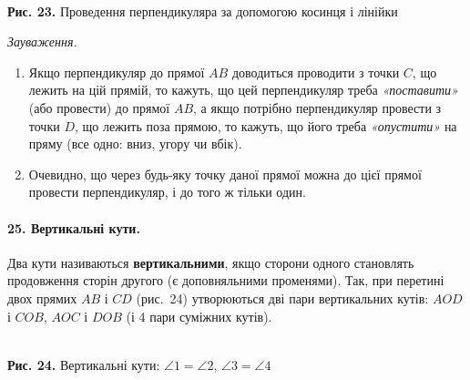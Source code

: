 \begin{center}
\\[4pt]
{\small\textbf{Рис. 23.} Проведення перпендикуляра за допомогою косинця і лінійки}
\end{center}

\textit{Зауваження.}
\begin{enumerate}
    \item Якщо перпендикуляр до прямої $AB$ доводиться проводити з точки $C$, що лежить на цій прямій, то кажуть, що цей перпендикуляр треба \textit{«поставити»} (або провести) до прямої $AB$, а якщо потрібно перпендикуляр провести з точки $D$, що лежить поза прямою, то кажуть, що його треба \textit{«опустити»} на пряму (все одно: вниз, угору чи вбік).
    \item Очевидно, що через будь-яку точку даної прямої можна до цієї прямої провести перпендикуляр, і до того ж тільки один.
\end{enumerate}

\paragraph{25. Вертикальні кути.}
Два кути називаються \textbf{вертикальними}, якщо сторони одного становлять продовження сторін другого (є доповняльними променями). Так, при перетині двох прямих $AB$ і $CD$ (рис.~24) утворюються дві пари вертикальних кутів: $AOD$ і $COB$, $AOC$ і $DOB$ (і 4 пари суміжних кутів).

\begin{center}
\\[4pt]
{\small\textbf{Рис. 24.} Вертикальні кути: $\angle 1 = \angle 2$, $\angle 3 = \angle 4$}
\end{center}

